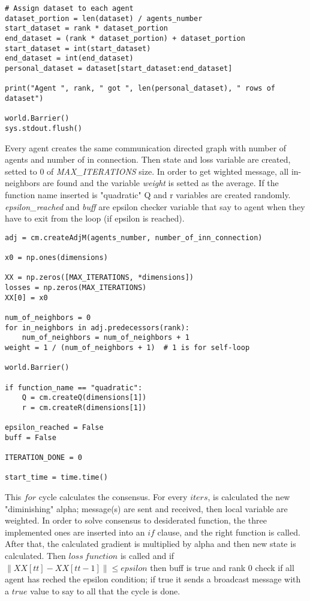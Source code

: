 \documentclass[a4paper,11pt,oneside]{book}
\begin{document}
\begin{lstlisting}
# Assign dataset to each agent
dataset_portion = len(dataset) / agents_number
start_dataset = rank * dataset_portion
end_dataset = (rank * dataset_portion) + dataset_portion
start_dataset = int(start_dataset)
end_dataset = int(end_dataset)
personal_dataset = dataset[start_dataset:end_dataset]

print("Agent ", rank, " got ", len(personal_dataset), " rows of dataset")

world.Barrier()
sys.stdout.flush()
\end{lstlisting}

Every agent creates the same communication directed graph with number of agents and number of in connection. Then state and loss variable are
created, setted to 0 of \textit{MAX\_ITERATIONS} size. In order to get wighted message, all in-neighbors are found and the variable \textit{weight}
is setted as the average. If the function name inserted is "quadratic" Q and r variables are created randomly. \textit{epsilon\_reached} and 
\textit{buff} are epsilon checker variable that say to agent when they have to exit from the loop (if epsilon is reached).

\begin{lstlisting}
adj = cm.createAdjM(agents_number, number_of_inn_connection)

x0 = np.ones(dimensions)

XX = np.zeros([MAX_ITERATIONS, *dimensions])
losses = np.zeros(MAX_ITERATIONS)
XX[0] = x0

num_of_neighbors = 0
for in_neighbors in adj.predecessors(rank):
    num_of_neighbors = num_of_neighbors + 1
weight = 1 / (num_of_neighbors + 1)  # 1 is for self-loop

world.Barrier()

if function_name == "quadratic":
    Q = cm.createQ(dimensions[1])
    r = cm.createR(dimensions[1])

epsilon_reached = False
buff = False

ITERATION_DONE = 0

start_time = time.time()
\end{lstlisting}

This $for$ cycle calculates the consensus. For every $iters$, is calculated the new "diminishing" alpha; message(s) are sent and received, then
local variable are weighted. In order to solve consensus to desiderated function, the three implemented ones are inserted into an $if$ clause, and the
right function is called. After that, the calculated gradient is multiplied by alpha and then new state is calculated. Then $loss \
function$ is called and if $\left\lVert XX[tt] - XX[tt-1] \right\rVert \leq epsilon$ then buff is true and rank 0 check if all agent has reched the
epsilon condition; if true it sends a broadcast message with a $true$ value to say to all that the cycle is done.
\end{document}
